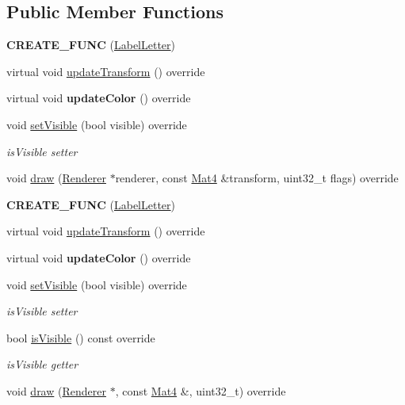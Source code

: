\subsection*{Public Member Functions}
\begin{DoxyCompactItemize}
\item 
\mbox{\label{classLabelLetter_a99a6d6553ffcaa0c7ef8d283088049e2}} 
{\bfseries C\+R\+E\+A\+T\+E\+\_\+\+F\+U\+NC} (\hyperlink{classLabelLetter}{Label\+Letter})
\item 
virtual void \hyperlink{classLabelLetter_ae52821b1e8fb7782602524f23c23b3ac}{update\+Transform} () override
\item 
\mbox{\label{classLabelLetter_a7b888e75a30233c9c86d9cd630cc7af3}} 
virtual void {\bfseries update\+Color} () override
\item 
void \hyperlink{classLabelLetter_aa46db980ecd91de0f00c7aee1f2f52f9}{set\+Visible} (bool visible) override
\begin{DoxyCompactList}\small\item\em is\+Visible setter \end{DoxyCompactList}\item 
void \hyperlink{classLabelLetter_a3e0850000ea292406f5d905a431b03dc}{draw} (\hyperlink{classRenderer}{Renderer} $\ast$renderer, const \hyperlink{classMat4}{Mat4} \&transform, uint32\+\_\+t flags) override
\item 
\mbox{\label{classLabelLetter_a99a6d6553ffcaa0c7ef8d283088049e2}} 
{\bfseries C\+R\+E\+A\+T\+E\+\_\+\+F\+U\+NC} (\hyperlink{classLabelLetter}{Label\+Letter})
\item 
virtual void \hyperlink{classLabelLetter_ae52821b1e8fb7782602524f23c23b3ac}{update\+Transform} () override
\item 
\mbox{\label{classLabelLetter_a7b888e75a30233c9c86d9cd630cc7af3}} 
virtual void {\bfseries update\+Color} () override
\item 
void \hyperlink{classLabelLetter_aa46db980ecd91de0f00c7aee1f2f52f9}{set\+Visible} (bool visible) override
\begin{DoxyCompactList}\small\item\em is\+Visible setter \end{DoxyCompactList}\item 
bool \hyperlink{classLabelLetter_a9f7187e6902a7b2a80ac3d2c5fc10523}{is\+Visible} () const override
\begin{DoxyCompactList}\small\item\em is\+Visible getter \end{DoxyCompactList}\item 
void \hyperlink{classLabelLetter_a676b176ed411500ac50b45c7cb104ce0}{draw} (\hyperlink{classRenderer}{Renderer} $\ast$, const \hyperlink{classMat4}{Mat4} \&, uint32\+\_\+t) override
\end{DoxyCompactItemize}

